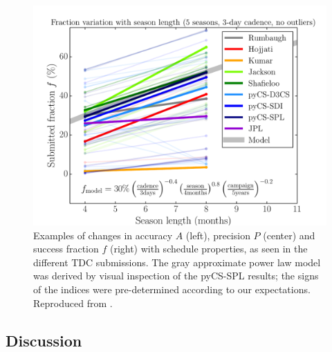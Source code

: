 \begin{figure}[!ht]
\begin{minipage}[b]{\linewidth}
\begin{minipage}[b]{0.32\linewidth}
      \centering\includegraphics[width=\linewidth]{figs/Fraction_season_nca.pdf}
    \end{minipage}
  \end{minipage}
\caption{Examples of changes in accuracy $A$ (left), precision $P$ (center) and success fraction $f$ (right) with schedule properties, as seen in the different TDC submissions. The gray
approximate power law model was derived by visual inspection of the
pyCS-SPL results; the signs of the indices were pre-determined according to our expectations. Reproduced from \citet{LiaoEtal2015}.}
\label{fig:tdcresults}
\end{figure}





\subsection{Discussion}
\label{sec:\secname:discussion}



\navigationbar

